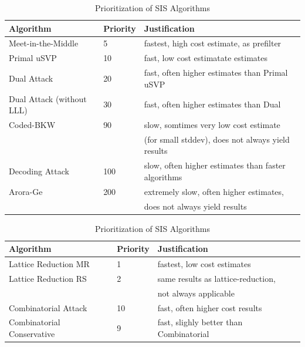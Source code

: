 \begin{table}[h!]
    \centering
    \begin{tabular}[]{lll}
        \toprule
        Algorithm                 & Priority & Justification                                       \\\hline
        Meet-in-the-Middle        & 5        & fastest, high cost estimate, as prefilter           \\
        Primal uSVP               & 10       & fast, low cost estimatate estimates                 \\
        Dual Attack               & 20       & fast, often higher estimates than Primal uSVP       \\
        Dual Attack (without LLL) & 30       & fast, often higher estimates than Dual              \\
        Coded-BKW                 & 90       & slow, somtimes very low cost estimate               \\
                                  &          & (for small stddev), does not always yield results   \\
        Decoding Attack           & 100      & slow, often higher estimates than faster algorithms \\
        Arora-Ge                  & 200      & extremely slow, often higher estimates,             \\
                                  &          & does not always yield results                       \\
        \bottomrule
    \end{tabular}
    \caption{Prioritization of LWE Algorithms}\label{tab:lwe-alg-prio}
    \vspace{1cm}
    \begin{tabular}[]{lll}
        \toprule
        Algorithm                  & Priority & Justification                           \\\hline
        Lattice Reduction MR       & 1        & fastest, low cost estimates             \\
        Lattice Reduction RS       & 2        & same results as lattice-reduction,      \\
                                   &          & not always applicable                   \\
        Combinatorial Attack       & 10       & fast, often higher cost results         \\
        Combinatorial Conservative & 9        & fast, slighly better than Combinatorial \\
        \bottomrule
    \end{tabular}
    \caption{Prioritization of SIS Algorithms}\label{tab:sis-alg-prio}
\end{table}


